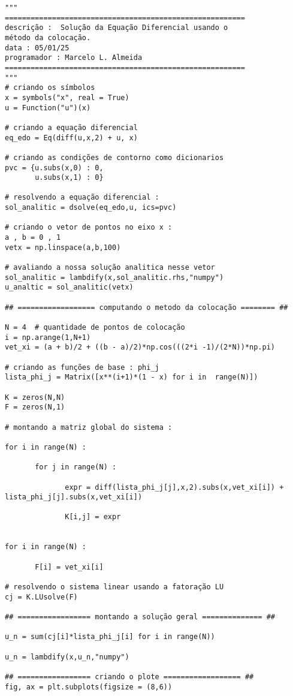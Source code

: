 \documentclass[a4paper, 12pt]{article}
\numberwithin{equation}{section}
\begin{document}
\begin{lstlisting}
"""
========================================================
descrição :  Solução da Equação Diferencial usando o 
método da colocação.
data : 05/01/25
programador : Marcelo L. Almeida 
========================================================
"""
# criando os símbolos 
x = symbols("x", real = True)
u = Function("u")(x)

# criando a equação diferencial 
eq_edo = Eq(diff(u,x,2) + u, x)

# criando as condições de contorno como dicionarios 
pvc = {u.subs(x,0) : 0, 
       u.subs(x,1) : 0}

# resolvendo a equação diferencial :
sol_analitic = dsolve(eq_edo,u, ics=pvc)

# criando o vetor de pontos no eixo x :
a , b = 0 , 1 
vetx = np.linspace(a,b,100)

# avaliando a nossa solução analitica nesse vetor 
sol_analitic = lambdify(x,sol_analitic.rhs,"numpy")
u_analtic = sol_analitic(vetx)

## ================== computando o metodo da colocação ======== ## 

N = 4  # quantidade de pontos de colocação 
i = np.arange(1,N+1)
vet_xi = (a + b)/2 + ((b - a)/2)*np.cos(((2*i -1)/(2*N))*np.pi)

# criando as funções de base : phi_j 
lista_phi_j = Matrix([x**(i+1)*(1 - x) for i in  range(N)]) 

K = zeros(N,N)
F = zeros(N,1)

# montando a matriz global do sistema :

for i in range(N) : 
       
       for j in range(N) : 
              
              expr = diff(lista_phi_j[j],x,2).subs(x,vet_xi[i]) + lista_phi_j[j].subs(x,vet_xi[i])
              
              K[i,j] = expr
              
              
for i in range(N) : 
       
       F[i] = vet_xi[i]
       
# resolvendo o sistema linear usando a fatoração LU 
cj = K.LUsolve(F)

## ================= montando a solução geral ============== ## 

u_n = sum(cj[i]*lista_phi_j[i] for i in range(N))

u_n = lambdify(x,u_n,"numpy")

## ================= criando o plote ================== ## 
fig, ax = plt.subplots(figsize = (8,6))


\end{lstlisting}
\end{document}

